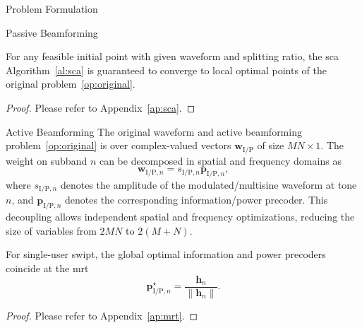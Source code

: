 \begin{section}{Problem Formulation}
\begin{subsection}{Passive Beamforming}
		\begin{proposition}\label{pr:sca}
			For any feasible initial point with given waveform and splitting ratio, the \gls{sca} Algorithm~\ref{al:sca} is guaranteed to converge to local optimal points of the original problem~\eqref{op:original}.
		\end{proposition}

		\begin{proof}\label{pf:sca}
			Please refer to Appendix~\ref{ap:sca}.
		\end{proof}
	\end{subsection}

	\begin{subsection}{Active Beamforming}
		The original waveform and active beamforming problem~\eqref{op:original} is over complex-valued vectors $\mathbf{w}_{\mathrm{I/P}}$ of size $MN \times 1$.
		The weight on subband $n$ can be decomposed in spatial and frequency domains as
		\begin{equation}\label{eq:w}
			\mathbf{w}_{\mathrm{I/P}, n} = s_{\mathrm{I/P}, n} \mathbf{p}_{\mathrm{I/P}, n},
		\end{equation}
		where $s_{\mathrm{I/P},n}$ denotes the amplitude of the modulated/multisine waveform at tone $n$, and $\mathbf{p}_{\mathrm{I/P}, n}$ denotes the corresponding information/power precoder.
		This decoupling allows independent spatial and frequency optimizations, reducing the size of variables from $2MN$ to $2(M+N)$.
		\begin{proposition}\label{pr:mrt}
			For single-user \gls{swipt}, the global optimal information and power precoders coincide at the \gls{mrt}
			\begin{equation}\label{eq:precoder_mrt}
				\mathbf{p}_{\mathrm{I/P}, n}^\star = \frac{\mathbf{h}_n}{\lVert{\mathbf{h}_n}\rVert}.
			\end{equation}
		\end{proposition}

		\begin{proof}\label{pf:mrt}
			Please refer to Appendix~\ref{ap:mrt}.
		\end{proof}
	\end{subsection}



\end{section}
